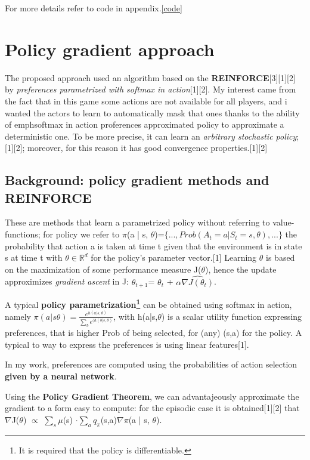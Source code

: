 \documentclass{article}
\begin{document}
For more details refer to code in appendix.\ref{code}

\section{Policy gradient approach}
\label{approach}
The proposed approach used an algorithm based on the \textbf{REINFORCE}[3][1][2] by \emph{preferences parametrized with softmax in action}[1][2].\newline
My interest came from the fact that in this game some actions are not available for all players, and i wanted the actors to learn to automatically mask that ones thanks to the ability of emph{softmax in action proferences} approximated policy to approximate a deterministic one. To be more precise, it can learn an \emph{arbitrary stochastic policy}; [1][2]; moreover, for this reason it has good convergence properties.[1][2]

\subsection{Background: policy gradient methods and REINFORCE}
These are methods that learn a parametrized policy without referring to value-functions; for policy we refer to $\pi$(a | s, $\theta$)=$\{...,Prob(A_t=a | S_t=s,\theta),...\}$ the probability that action a is taken at time t given that the environment is in state s at time t with $\theta \in \mathbb{R}^{d}$ for the policy’s parameter vector.[1]\newline
Learning $\theta$ is based on the maximization of some performance measure J($\theta$), hence the update 
approximizes \emph{gradient ascent} in J: $\theta_{t+1}$= $\theta_t$ + $\alpha\hat{\nabla{J(\theta_t)}}$.


A typical \textbf{policy parametrization\footnote{It is required that the policy is differentiable.}} can be obtained using softmax in action, namely \newline $\pi(a|s\theta)= \frac{e^{h(a|s,\theta)}}{ \sum_b e^{(h(b|s,\theta)}}$, with h(a|s,$\theta$) is a scalar utility function expressing preferences, that is higher Prob of being selected, for (any) (s,a) for the policy. A typical to way to express the preferences is using linear features[1].

In my work, preferences are computed using the probabilities of action selection \textbf{given by a neural network}.

Using the \textbf{Policy Gradient Theorem}, we can advantajeously approximate the gradient to a form easy to compute: for the episodic case it is obtained[1][2] that $\nabla$J($\theta$) $\propto$ $\sum_s\mu$(s) $\cdot\sum_aq_\pi$(s,a)$\nabla\pi$(a | s, $\theta$).
\end{document}
